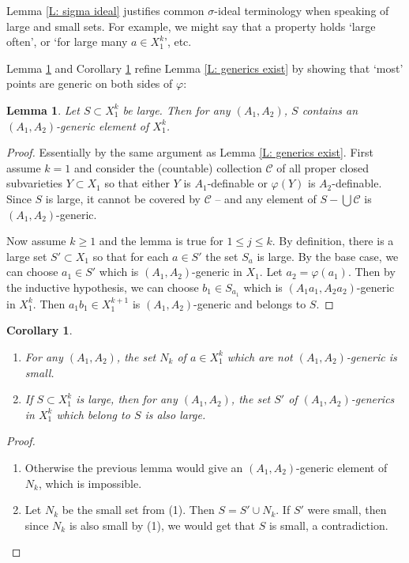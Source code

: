\documentclass{amsart}
\newtheorem{lemma}[theorem]{Lemma}
\newtheorem{corollary}[theorem]{Corollary}
\theoremstyle{definition}
\begin{document}
Lemma \ref{L: sigma ideal} justifies common $\sigma$-ideal terminology when speaking of large and small sets. For example, we might say that a property holds `large often', or `for large many $a\in X_1^k$', etc.

Lemma \ref{L: generics in large set} and Corollary \ref{C: non-generics are small} refine Lemma \ref{L: generics exist} by showing that `most' points are generic on both sides of $\varphi$:

\begin{lemma}\label{L: generics in large set}
    Let $S\subset X_1^k$ be large. Then for any $(A_1,A_2)$, $S$ contains an $(A_1,A_2)$-generic element of $X_1^k$.
\end{lemma}
\begin{proof}
    Essentially by the same argument as Lemma \ref{L: generics exist}. First assume $k=1$ and consider the (countable) collection $\mathcal C$ of all proper closed subvarieties $Y\subset X_1$ so that either $Y$ is $A_1$-definable or $\varphi(Y)$ is $A_2$-definable. Since $S$ is large, it cannot be covered by $\mathcal C$ -- and any element of $S-\bigcup\mathcal C$ is $(A_1,A_2)$-generic.

    Now assume $k\geq 1$ and the lemma is true for $1\leq j\leq k$. By definition, there is a large set $S'\subset X_1$ so that for each $a\in S'$ the set $S_a$ is large. By the base case, we can choose $a_1\in S'$ which is $(A_1,A_2)$-generic in $X_1$. Let $a_2=\varphi(a_1)$. Then by the inductive hypothesis, we can choose $b_1\in S_{a_1}$ which is $(A_1a_1,A_2a_2)$-generic in $X_1^k$. Then $a_1b_1\in X_1^{k+1}$ is $(A_1,A_2)$-generic and belongs to $S$. 
\end{proof}

\begin{corollary}\label{C: non-generics are small}
    \begin{enumerate}
        \item For any $(A_1,A_2)$, the set $N_k$ of $a\in X_1^k$ which are not $(A_1,A_2)$-generic is small.
        \item If $S\subset X_1^k$ is large, then for any $(A_1,A_2)$, the set $S'$ of $(A_1,A_2)$-generics in $X_1^k$ which belong to $S$ is also large.
    \end{enumerate}
\end{corollary}
\begin{proof}
    \begin{enumerate}
        \item Otherwise the previous lemma would give an $(A_1,A_2)$-generic element of $N_k$, which is impossible.
        \item Let $N_k$ be the small set from (1). Then $S=S'\cup N_k$. If $S'$ were small, then since $N_k$ is also small by (1), we would get that $S$ is small, a contradiction.
    \end{enumerate}
\end{proof}
\end{document}
